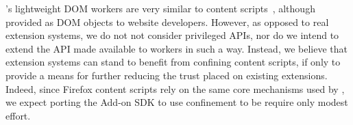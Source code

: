 %
\sys{}'s lightweight DOM workers are very similar to content
scripts~\cite{Carlini:2012}, although provided as DOM objects to
website developers.
%
However, as opposed to real extension systems, we do not not consider
privileged APIs, nor do we intend to extend the API made available to
workers in such a way.
%
Instead, we believe that extension systems can stand to benefit from
confining content scripts, if only to provide a means for further
reducing the trust placed on existing extensions.
%
Indeed, since Firefox content scripts rely on the same core mechanisms
used by \sys{}, we expect porting the Add-on SDK to use confinement to
be require only modest effort.
 

